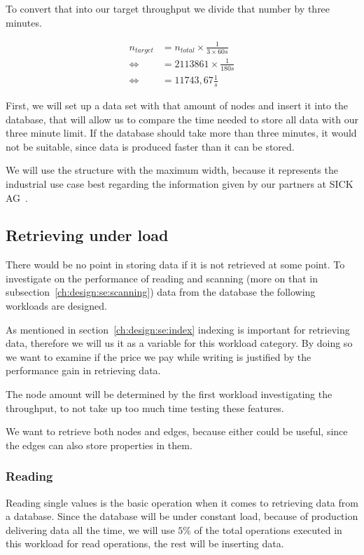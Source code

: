 To convert that into our target throughput we divide that number by three minutes.

\begin{equation}
  \label{eq:dataElements}
  \begin{aligned}
    n_{target} &= n_{total} \times \frac{1}{3 \times 60s} \\
    \iff &= 2113861 \times \frac{1}{180s} \\
    \iff &= 11743,67 \frac{1}{s}
  \end{aligned}
\end{equation}

First,
we will set up a data set with that amount of nodes and insert it into the database,
that will allow us to compare the time needed to store all data with our three minute limit.
If the database should take more than three minutes,
it would not be suitable,
since data is produced faster than it can be stored.

We will use the structure with the maximum width,
because it represents the industrial use case best regarding the information given by our partners at SICK AG~\cite{SICK}.

\subsection{Retrieving under load}
\label{ch:design:se:retrievingUnderLoad}
There would be no point in storing data if it is not retrieved at some point.
To investigate on the performance of reading and scanning (more on that in subsection~\ref{ch:design:se:scanning}) data from the database the following workloads are designed.

As mentioned in section~\ref{ch:design:se:index} indexing is important for retrieving data,
therefore we will us it as a variable for this workload category.
By doing so we want to examine if the price we pay while writing is justified by the performance gain in retrieving data.

The node amount will be determined by the first workload investigating the throughput,
to not take up too much time testing these features.

We want to retrieve both nodes and edges,
because either could be useful,
since the edges can also store properties in them.

\subsubsection{Reading}
\label{ch:design:se:reading}
Reading single values is the basic operation when it comes to retrieving data from a database.
Since the database will be under constant load,
because of production delivering data all the time,
we will use $ 5\% $ of the total operations executed in this workload for read operations,
the rest will be inserting data.

